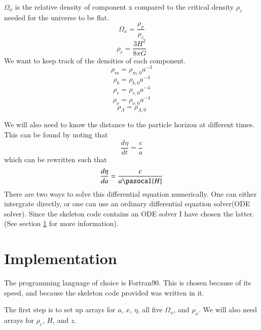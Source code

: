 \documentclass{aa}   %
\begin{document}
$\Omega_x$ is the relative density of component x compared to the critical density $\rho_c$ needed for the universe to be flat.
\begin{equation}
 \Omega_x = \frac{\rho_x}{\rho_c}
\end{equation}
\begin{equation}
 \rho_c = \frac{3H^2}{8\pi G}
\end{equation}
We want to keep track of the densities of each component.
\begin{equation}
 \rho_m = \rho_{m,0}a^{-3}
\end{equation}
\begin{equation}
 \rho_b = \rho_{b,0}a^{-3}
\end{equation}
\begin{equation}
 \rho_r = \rho_{r,0}a^{-4}
\end{equation}
\begin{equation}
 \rho_\nu = \rho_{\nu,0}a^{-4}
\end{equation}
\begin{equation}
 \rho_\Lambda = \rho_{\Lambda,0}
\end{equation}

We will also need to know the distance to the particle horizon at different times. This can be found by noting that
\begin{equation*}
 \frac{d\eta}{dt} = \frac{c}{a}
\end{equation*}
which can be rewritten such that
\begin{equation}\label{eta}
 \frac{d\eta}{da} = \frac{c}{a \pazocal{H}}
\end{equation}
There are two ways to solve this differential equation numerically. One can either intergrate directly, or one can use an ordinary differential equation solver(ODE solver). Since the skeleton code contains an ODE solver I have chosen the latter. (See section \ref{sec:Imp} for more information).

\section{Implementation}\label{sec:Imp}
The programming language of choice is Fortran90. This is chosen because of its speed, and because the skeleton code provided was written in it. 

The first step is to set up arrays for $a$, $x$, $\eta$, all five $\Omega_x$, and $\rho_x$. We will also need arrays for $\rho_c$, $H$, and $z$.
\end{document}
